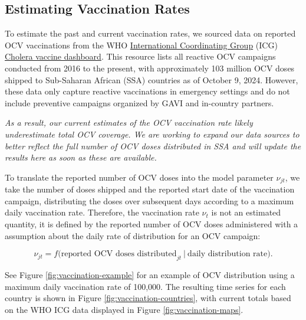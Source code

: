 \documentclass[
]{book}
\begin{document}
\subsection{Estimating Vaccination Rates}\label{estimating-vaccination-rates}

To estimate the past and current vaccination rates, we sourced data on reported OCV vaccinations from the WHO \href{https://www.who.int/groups/icg}{International Coordinating Group} (ICG) \href{https://app.powerbi.com/view?r=eyJrIjoiYmFmZTBmM2EtYWM3Mi00NWYwLTg3YjgtN2Q0MjM5ZmE1ZjFkIiwidCI6ImY2MTBjMGI3LWJkMjQtNGIzOS04MTBiLTNkYzI4MGFmYjU5MCIsImMiOjh9}{Cholera vaccine dashboard}. This resource lists all reactive OCV campaigns conducted from 2016 to the present, with approximately 103 million OCV doses shipped to Sub-Saharan African (SSA) countries as of October 9, 2024. However, these data only capture reactive vaccinations in emergency settings and do not include preventive campaigns organized by GAVI and in-country partners.

\emph{As a result, our current estimates of the OCV vaccination rate likely underestimate total OCV coverage. We are working to expand our data sources to better reflect the full number of OCV doses distributed in SSA and will update the results here as soon as these are available.}

To translate the reported number of OCV doses into the model parameter \(\nu_{jt}\), we take the number of doses shipped and the reported start date of the vaccination campaign, distributing the doses over subsequent days according to a maximum daily vaccination rate. Therefore, the vaccination rate \(\nu_t\) is not an estimated quantity, it is defined by the reported number of OCV doses administered with a assumption about the daily rate of distribution for an OCV campaign:

\[
\nu_{jt} = f\big(\text{reported OCV doses distributed}_{jt} \ | \ \text{daily distribution rate}\big).    
\]

See Figure \ref{fig:vaccination-example} for an example of OCV distribution using a maximum daily vaccination rate of 100,000. The resulting time series for each country is shown in Figure \ref{fig:vaccination-countries}, with current totals based on the WHO ICG data displayed in Figure \ref{fig:vaccination-maps}.
\end{document}
